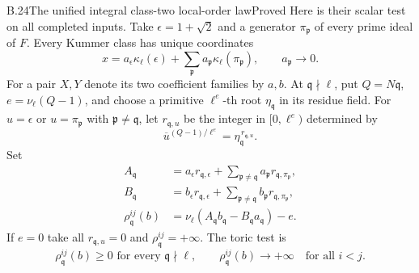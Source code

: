 \begin{statement}{B.24}{The unified integral class-two local-order law}{Proved}
Here is their scalar test on all completed inputs.
Take $\epsilon=1+\sqrt2$ and a generator $\pi_{\mathfrak p}$
of every prime ideal of $F$. Every Kummer class has unique
coordinates
\[
 x=a_\epsilon\kappa_\ell(\epsilon)
       +\sum_{\mathfrak p}a_{\mathfrak p}
                         \kappa_\ell(\pi_{\mathfrak p}),
 \qquad a_{\mathfrak p}\longrightarrow0.
                                                               \tag{B.24.13}
\]
For a pair $X,Y$ denote its two coefficient families by
$a,b$. At $\mathfrak q\nmid\ell$, put
$Q=N\mathfrak q$, $e=\nu_\ell(Q-1)$, and choose
a primitive $\ell^e$-th root $\eta_{\mathfrak q}$
in its residue field. For $u=\epsilon$ or
$u=\pi_{\mathfrak p}$ with $\mathfrak p\ne\mathfrak q$,
let $r_{\mathfrak q,u}$ be the integer in $[0,\ell^e)$
determined by
\[
 \overline u^{(Q-1)/\ell^e}
       =\eta_{\mathfrak q}^{\,r_{\mathfrak q,u}}.
\]
Set
\[
 \begin{split}
 A_{\mathfrak q}
 &=a_\epsilon r_{\mathfrak q,\epsilon}
    +\sum_{\mathfrak p\ne\mathfrak q}
                    a_{\mathfrak p}r_{\mathfrak q,\pi_{\mathfrak p}},\\
 B_{\mathfrak q}
 &=b_\epsilon r_{\mathfrak q,\epsilon}
    +\sum_{\mathfrak p\ne\mathfrak q}
                    b_{\mathfrak p}r_{\mathfrak q,\pi_{\mathfrak p}},\\
 \rho^{ij}_{\mathfrak q}(b)
 &=\nu_\ell(A_{\mathfrak q}b_{\mathfrak q}
                -B_{\mathfrak q}a_{\mathfrak q})-e .
 \end{split}                                                    \tag{B.24.14}
\]
If $e=0$ take all $r_{\mathfrak q,u}=0$ and
$\rho^{ij}_{\mathfrak q}=+\infty$.
The toric test is
\[
 \rho^{ij}_{\mathfrak q}(b)\geq0\text{ for every }\mathfrak q\nmid\ell,
 \qquad
 \rho^{ij}_{\mathfrak q}(b)\longrightarrow+\infty
          \quad\text{for all }i<j.
                                                               \tag{B.24.15}
\]


\end{statement}
